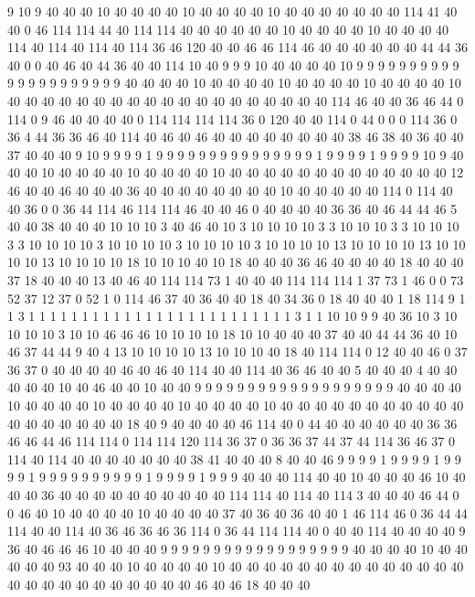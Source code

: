 9 10 9 40 40 40 10 40 40 40 40 10 40 40 40 40 10 40 40 40
40 40 40 40 114 41 40 40 0 46 114 114 44 40 114 114 40 40 40 40
40 40 10 40 40 40 40 10 40 40 40 40 114 40 114 40 114 40 114 36
46 120 40 40 46 46 114 46 40 40 40 40 40 40 44 44 36 40 0 0
40 46 40 44 36 40 40 114 10 40 9 9 9 10 40 40 40 40 10 9
9 9 9 9 9 9 9 9 9 9 9 9 9 9 9 9 9 9 9 9
40 40 40 40 10 40 40 40 40 10 40 40 40 40 10 40 40 40 40 10
40 40 40 40 40 40 40 40 40 40 40 40 40 40 40 40 40 40 40 114
46 40 40 36 46 44 0 114 0 9 46 40 40 40 40 0 114 114 114 114
36 0 120 40 40 114 0 44 0 0 0 114 36 0 36 4 44 36 36 46
40 114 40 46 40 46 40 40 40 40 40 40 40 40 38 46 38 40 36 40
40 37 40 40 40 9 10 9 9 9 9 1 9 9 9 9 9 9 9 9
9 9 9 9 9 9 9 1 9 9 9 9 1 9 9 9 9 10 9 40
40 40 10 40 40 40 40 10 40 40 40 40 10 40 40 40 40 40 40 40
40 40 40 40 40 40 12 46 40 40 46 40 40 40 36 40 40 40 40 40
40 40 40 10 40 40 40 40 40 114 0 114 40 40 36 0 0 36 44 114
46 114 114 46 40 40 46 0 40 40 40 40 36 36 40 46 44 44 46 5
40 40 38 40 40 40 10 10 10 3 40 46 40 10 3 10 10 10 10 3
3 10 10 10 3 3 10 10 10 3 3 10 10 10 10 3 10 10 10 10
3 10 10 10 10 3 10 10 10 10 13 10 10 10 10 13 10 10 10 10
13 10 10 10 10 18 10 10 10 40 10 18 40 40 40 36 46 40 40 40
40 18 40 40 40 37 18 40 40 40 13 40 46 40 114 114 73 1 40 40
40 114 114 114 1 37 73 1 46 0 0 73 52 37 12 37 0 52 1 0
114 46 37 40 36 40 40 18 40 34 36 0 18 40 40 40 1 18 114 9
1 1 3 1 1 1 1 1 1 1 1 1 1 1 1 1 1 1 1 1
1 1 1 1 1 1 1 1 3 1 1 10 10 9 9 40 36 10 3 10
10 10 10 3 10 10 46 46 46 10 10 10 10 18 10 10 40 40 40 37
40 40 44 44 36 40 10 46 37 44 44 9 40 4 13 10 10 10 10 13
10 10 10 40 18 40 114 114 0 12 40 40 46 0 37 36 37 0 40 40
40 40 46 40 46 40 114 40 40 114 40 36 46 40 40 5 40 40 40 4
40 40 40 40 40 10 40 46 40 40 10 40 40 9 9 9 9 9 9 9
9 9 9 9 9 9 9 9 9 9 9 9 40 40 40 40 10 40 40 40
40 10 40 40 40 40 10 40 40 40 40 10 40 40 40 40 40 40 40 40
40 40 40 40 40 40 40 40 40 40 18 40 9 40 40 40 40 46 114 40
0 44 40 40 40 40 40 40 36 36 46 46 44 46 114 114 0 114 114 120
114 36 37 0 36 36 37 44 37 44 114 36 46 37 0 114 40 114 40 40
40 40 40 40 40 38 41 40 40 40 8 40 40 46 9 9 9 9 1 9
9 9 9 1 9 9 9 9 1 9 9 9 9 9 9 9 9 9 9 1
9 9 9 9 1 9 9 9 40 40 40 114 40 40 10 40 40 40 46 10
40 40 40 36 40 40 40 40 40 40 40 40 40 40 114 114 40 114 40 114
3 40 40 40 46 44 0 0 46 40 10 40 40 40 40 10 40 40 40 40
37 40 36 40 36 40 40 1 46 114 46 0 36 44 44 114 40 40 114 40
36 46 36 46 36 114 0 36 44 114 114 40 0 40 40 114 40 40 40 40
9 36 40 46 46 46 10 40 40 40 9 9 9 9 9 9 9 9 9 9
9 9 9 9 9 9 9 9 40 40 40 40 10 40 40 40 40 40 93 40
40 40 10 40 40 40 40 10 40 40 40 40 40 40 40 40 40 40 40 40
40 40 40 40 40 40 40 40 40 40 40 40 40 46 40 46 18 40 40 40
